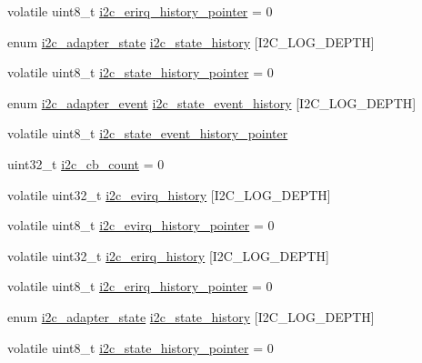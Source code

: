 \begin{DoxyCompactItemize}
\item 
volatile uint8\-\_\-t \hyperlink{group___p_i_o_s___i2_c_ga0593115613cf2d368fe6dbe7b4e5dcff}{i2c\-\_\-erirq\-\_\-history\-\_\-pointer} = 0
\item 
enum \hyperlink{pios__i2c__priv_8h_ac73b69ffe53544057fa2e4751fd9c22b}{i2c\-\_\-adapter\-\_\-state} \hyperlink{group___p_i_o_s___i2_c_ga207839e0ce4c1011c30ea9254657251c}{i2c\-\_\-state\-\_\-history} \mbox{[}\-I2\-C\-\_\-\-L\-O\-G\-\_\-\-D\-E\-P\-T\-H\mbox{]}
\item 
volatile uint8\-\_\-t \hyperlink{group___p_i_o_s___i2_c_gad02d69a4953e925d905e000697a0d885}{i2c\-\_\-state\-\_\-history\-\_\-pointer} = 0
\item 
enum \hyperlink{group___p_i_o_s___i2_c_ga2a8f77797f5dbd873514e92d3d043649}{i2c\-\_\-adapter\-\_\-event} \hyperlink{group___p_i_o_s___i2_c_gad2fddef6926d27512901cbe84b7b99bd}{i2c\-\_\-state\-\_\-event\-\_\-history} \mbox{[}\-I2\-C\-\_\-\-L\-O\-G\-\_\-\-D\-E\-P\-T\-H\mbox{]}
\item 
volatile uint8\-\_\-t \hyperlink{group___p_i_o_s___i2_c_gabdb9d9357371d1ece20779da0d69d27b}{i2c\-\_\-state\-\_\-event\-\_\-history\-\_\-pointer}
\item 
uint32\-\_\-t \hyperlink{group___p_i_o_s___i2_c_gadd232b764b6676824e5a173a7b78f9fd}{i2c\-\_\-cb\-\_\-count} = 0
\item 
volatile uint32\-\_\-t \hyperlink{group___p_i_o_s___i2_c_ga958ee525a13dda424039275af66ad3ce}{i2c\-\_\-evirq\-\_\-history} \mbox{[}\-I2\-C\-\_\-\-L\-O\-G\-\_\-\-D\-E\-P\-T\-H\mbox{]}
\item 
volatile uint8\-\_\-t \hyperlink{group___p_i_o_s___i2_c_gadf5676851d3bae320be666713dd5cb95}{i2c\-\_\-evirq\-\_\-history\-\_\-pointer} = 0
\item 
volatile uint32\-\_\-t \hyperlink{group___p_i_o_s___i2_c_ga682906503c30ce6f539ac8f7628346f8}{i2c\-\_\-erirq\-\_\-history} \mbox{[}\-I2\-C\-\_\-\-L\-O\-G\-\_\-\-D\-E\-P\-T\-H\mbox{]}
\item 
volatile uint8\-\_\-t \hyperlink{group___p_i_o_s___i2_c_ga0593115613cf2d368fe6dbe7b4e5dcff}{i2c\-\_\-erirq\-\_\-history\-\_\-pointer} = 0
\item 
enum \hyperlink{pios__i2c__priv_8h_ac73b69ffe53544057fa2e4751fd9c22b}{i2c\-\_\-adapter\-\_\-state} \hyperlink{group___p_i_o_s___i2_c_ga207839e0ce4c1011c30ea9254657251c}{i2c\-\_\-state\-\_\-history} \mbox{[}\-I2\-C\-\_\-\-L\-O\-G\-\_\-\-D\-E\-P\-T\-H\mbox{]}
\item 
volatile uint8\-\_\-t \hyperlink{group___p_i_o_s___i2_c_gad02d69a4953e925d905e000697a0d885}{i2c\-\_\-state\-\_\-history\-\_\-pointer} = 0

\end{DoxyCompactItemize}
